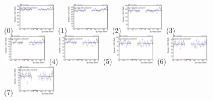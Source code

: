 \begin{figure}[h!]
        \centering
        \subfigure(0){\includegraphics[width=0.2\textwidth]{power_law/plots/all/massfit_all_40bins_bdtcut0.15.png}}
        \subfigure(1){\includegraphics[width=0.2\textwidth]{power_law/plots/all/massfit_all_40bins_bdtcut0.21.png}}
        \subfigure(2){\includegraphics[width=0.2\textwidth]{power_law/plots/all/massfit_all_40bins_bdtcut0.27.png}}
        \subfigure(3){\includegraphics[width=0.2\textwidth]{power_law/plots/all/massfit_all_40bins_bdtcut0.33.png}}
        \subfigure(4){\includegraphics[width=0.2\textwidth]{power_law/plots/all/massfit_all_40bins_bdtcut0.35.png}}
        \subfigure(5){\includegraphics[width=0.2\textwidth]{power_law/plots/all/massfit_all_40bins_bdtcut0.39.png}}
        \subfigure(6){\includegraphics[width=0.2\textwidth]{power_law/plots/all/massfit_all_40bins_bdtcut0.43.png}}
        \subfigure(7){\includegraphics[width=0.2\textwidth]{power_law/plots/all/massfit_all_40bins_bdtcut0.47.png}}

\end{figure}
